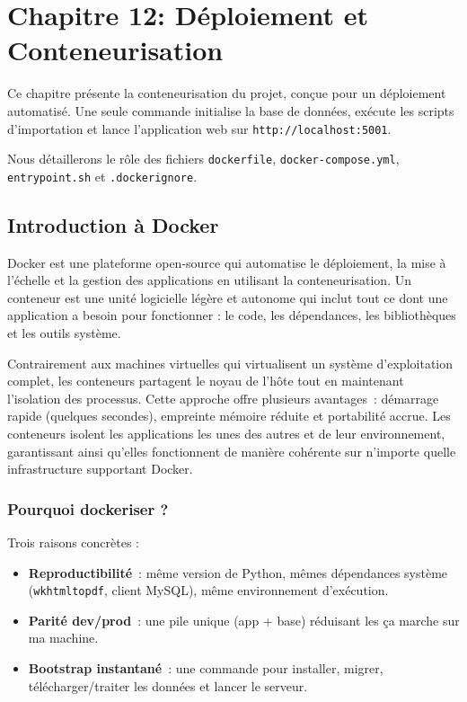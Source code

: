 \chapter{Chapitre 12: Déploiement et Conteneurisation}
\label{chap:deploiement}

Ce chapitre présente la conteneurisation du projet, conçue pour un déploiement automatisé. Une seule commande initialise la base de données, exécute les scripts d'importation et lance l'application web sur \texttt{http://localhost:5001}.

Nous détaillerons le rôle des fichiers \texttt{dockerfile}, \texttt{docker-compose.yml}, \texttt{entrypoint.sh} et \texttt{.dockerignore}.

\section{Introduction à Docker}
Docker est une plateforme open-source qui automatise le déploiement, la mise à l'échelle et la gestion des applications en utilisant la conteneurisation. Un conteneur est une unité logicielle légère et autonome qui inclut tout ce dont une application a besoin pour fonctionner : le code, les dépendances, les bibliothèques et les outils système. 

Contrairement aux machines virtuelles qui virtualisent un système d'exploitation complet, les conteneurs partagent le noyau de l'hôte tout en maintenant l'isolation des processus. Cette approche offre plusieurs avantages : démarrage rapide (quelques secondes), empreinte mémoire réduite et portabilité accrue. Les conteneurs isolent les applications les unes des autres et de leur environnement, garantissant ainsi qu'elles fonctionnent de manière cohérente sur n'importe quelle infrastructure supportant Docker.

\subsection{Pourquoi dockeriser ?}

Trois raisons concrètes :
\begin{itemize}
  \item \textbf{Reproductibilité} : même version de Python, mêmes dépendances système (\texttt{wkhtmltopdf}, client MySQL), même environnement d'exécution.
  \item \textbf{Parité dev/prod} : une pile unique (app + base) réduisant les \og ça marche sur ma machine\fg{}.
  \item \textbf{Bootstrap instantané} : une commande pour installer, migrer, télécharger/traiter les données et lancer le serveur.
\end{itemize}

